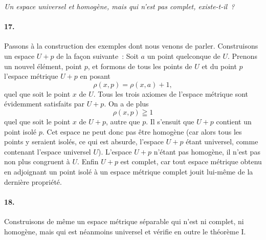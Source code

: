 \documentclass[a4paper,12pt]{amsart}
\begin{document}
\textit{Un espace universel et homogène, mais qui n'est pas complet, existe-t-il~?}

\paragraph{17.}
Passons à la construction des exemples dont nous venons de parler. Construisons un espace $U+p$ de la façon suivante~: Soit $a$ un point quelconque de $U$. Prenons un nouvel élément, point $p$, et formons de tous les points de $U$ et du point $p$ l'espace métrique $U+p$ en posant
\[
\rho(x,p)=\rho(x,a)+1,
\]
quel que soit le point $x$ de $U$. Tous les trois axiomes de l'espace métrique sont évidemment satisfaits par $U+p$. On a de plus
\[
\rho(x,p)\geqq1
\]
quel que soit le point $x$ de $U+p$, autre que $p$. Il s'ensuit que $U+p$ contient un point isolé $p$. Cet espace ne peut donc pas être homogène (car alors tous les points y seraient isolés, ce qui est absurde, l'espace $U+p$ étant universel, comme contenant l'espace universel $U$). L'espace $U+p$ n'étant pas homogène, il n'est pas non plus congruent à $U$. Enfin $U+p$ est complet, car tout espace métrique obtenu en adjoignant un point isolé à un espace métrique complet jouit lui-même de la dernière propriété.

\paragraph{18.}
Construisons de même un espace métrique séparable qui n'est ni complet, ni homogène, mais qui est néanmoins universel et vérifie en outre le théorème I.
\end{document}
